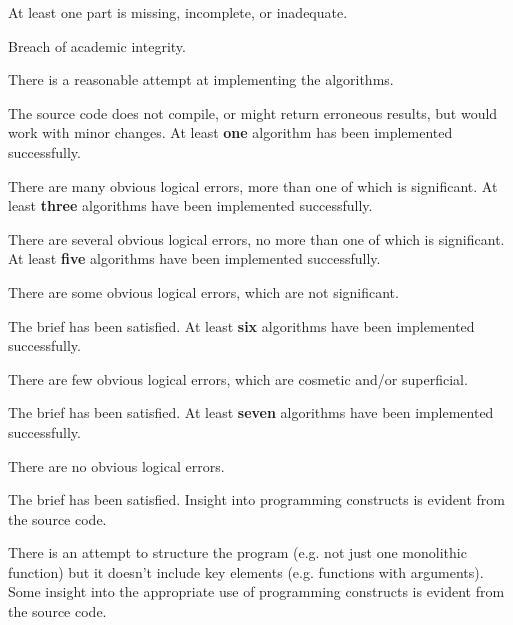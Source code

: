 \documentclass{../../fal_assignment}
\begin{document}
\begin{markingrubric}
%
        \grade \fail At least one part is missing, incomplete, or inadequate.
                   \par Breach of academic integrity.
                   
        \grade  %
        \grade  %
        \grade  %
        \grade  %
        \grade  %
%

        \grade\fail 	There is a reasonable attempt at implementing the algorithms.
            \par 		The source code does not compile, or might return erroneous results, but would work with minor changes.
        \grade 		At least \textbf{one} algorithm has been implemented successfully.
            \par 		There are many obvious logical errors, more than one of which is significant.   
        \grade 		At least \textbf{three} algorithms have been  implemented successfully.
            \par 		There are several obvious logical errors, no more than one of which is significant. 
        \grade 		At least \textbf{five} algorithms have been implemented successfully.
            \par 		There are some obvious logical errors, which are not significant. 
            \par		The brief has been satisfied.
        \grade 		At least \textbf{six} algorithms have been implemented successfully.
            \par 		There are few obvious logical errors, which are cosmetic and/or superficial.
            \par		The brief has been satisfied.     
        \grade 		At least \textbf{seven} algorithms have been implemented successfully.
            \par		There are no obvious logical errors.
            \par		The brief has been satisfied.
%
        \grade\fail Insight into programming constructs is evident from the source code.
            \par There is an attempt to structure the program (e.g. not just one monolithic function) but it doesn't include key elements (e.g. functions with arguments).
        \grade Some insight into the appropriate use of programming constructs is evident from the source code.

\end{markingrubric}
\end{document}
